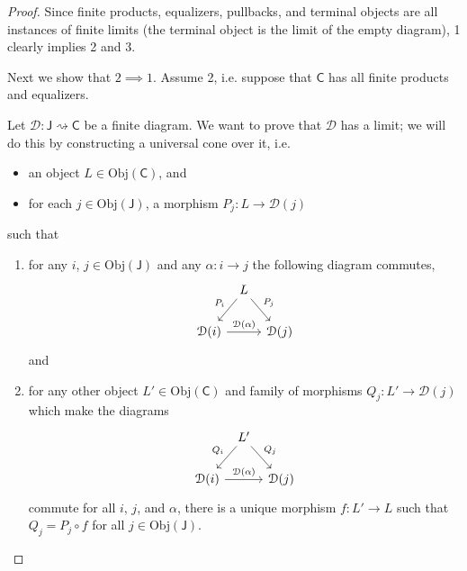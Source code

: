 \documentclass[a4paper,10pt]{scrreprt}
\newcommand{\Obj}{\mathrm{Obj}}
\theoremstyle{definition}
\theoremstyle{plain}
\theoremstyle{remark}
\begin{document}
\begin{proof}
  Since finite products, equalizers, pullbacks, and terminal objects are all instances of finite limits (the terminal object is the limit of the empty diagram), 1 clearly implies 2 and 3. 

  Next we show that $2 \implies 1$. Assume 2, i.e. suppose that $\mathsf{C}$ has all finite products and equalizers. 

  Let $\mathcal{D}\colon \mathsf{J} \rightsquigarrow \mathsf{C}$ be a finite diagram. We want to prove that $\mathcal{D}$ has a limit; we will do this by constructing a universal cone over it, i.e.
  \begin{itemize}
    \item an object $L \in \Obj(\mathsf{C})$, and
    \item for each $j \in \Obj(\mathsf{J})$, a morphism $P_{j}\colon L \to \mathcal{D}(j)$ 
  \end{itemize}
  such that
  \begin{enumerate}
    \item for any $i$, $j \in \Obj(\mathsf{J})$ and any $\alpha\colon i \to j$ the following diagram commutes,
      \begin{equation*}
        \begin{tikzcd}[column sep=tiny]
          & L
          \arrow[dl, swap, "P_{i}"]
          \arrow[dr, "P_{j}"]
          \\
          \mathcal{D}(i)
          \arrow[rr, "\mathcal{D}(\alpha)"]
          & & \mathcal{D}(j)
        \end{tikzcd}
      \end{equation*}
      and
    \item for any other object $L' \in \Obj(\mathsf{C})$ and family of morphisms $Q_{j}\colon L' \to \mathcal{D}(j)$ which make the diagrams
      \begin{equation*}
        \begin{tikzcd}[column sep=tiny]
          & L'
          \arrow[dl, swap, "Q_{i}"]
          \arrow[dr, "Q_{j}"]
          \\
          \mathcal{D}(i)
          \arrow[rr, "\mathcal{D}(\alpha)"]
          & & \mathcal{D}(j)
        \end{tikzcd}
      \end{equation*}
      commute for all $i$, $j$, and $\alpha$, there is a unique morphism $f\colon L' \to L$ such that $Q_{j} = P_{j} \circ f$ for all $j \in \Obj(\mathsf{J})$.
  \end{enumerate}


\end{proof}
\end{document}
